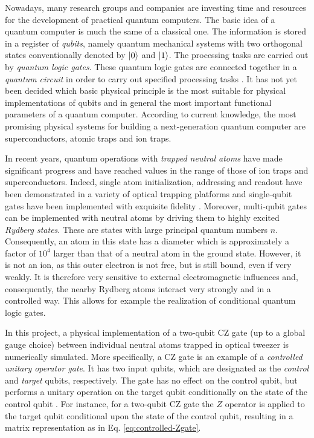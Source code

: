\documentclass[rmp,10pt,onecolumn,fleqn,notitlepage]{revtex4-1}
\begin{document}
Nowadays, many research groups and companies are investing time and resources for the development of practical quantum computers.
The basic idea of a quantum computer is much the same of a classical one. The information is stored in a register of \textit{qubits}, namely quantum mechanical systems with two orthogonal states conventionally denoted by $\left\vert{0}\right\rangle$ and $\left\vert{1}\right\rangle$.
The processing tasks are carried out by \textit{quantum logic gates}. These quantum logic gates are connected together in a \textit{quantum circuit} in order to carry out specified processing tasks \cite{10.5555/1200964}.
It has not yet been decided which basic physical principle is the most suitable for physical implementations of qubits and in general the most important functional parameters of a quantum computer. According to current knowledge, the most promising physical systems for building a next-generation quantum computer are superconductors, atomic traps and ion traps.

In recent years, quantum operations with \textit{trapped neutral atoms} have made significant progress and have reached values in the range of those of ion traps and superconductors.
Indeed, single atom initialization, addressing and readout have been demonstrated in a variety of optical trapping platforms and single-qubit gates have been implemented with exquisite fidelity \cite{PhysRevLett.123.170503}.
Moreover, multi-qubit gates can be implemented with neutral atoms by driving them to highly excited \textit{Rydberg states}.
These are states with large principal quantum numbers $n$.
Consequently, an atom in this state has a diameter which is approximately a factor of $10^4$ larger than that of a neutral atom in the ground state. However, it is not an ion, as this outer electron is not free, but is still bound, even if very weakly.
It is therefore very sensitive to external electromagnetic influences and, consequently, the nearby Rydberg atoms interact very strongly and in a controlled way. This allows for example the realization of conditional quantum logic gates.

In this project, a physical implementation \cite{PhysRevLett.123.170503} of a two-qubit CZ gate (up to a global gauge choice) between individual neutral atoms trapped in optical tweezer is numerically simulated. More specifically, a CZ gate is an example of a \textit{controlled unitary operator gate}. It has two input qubits, which are designated as the \textit{control} and \textit{target} qubits, respectively. The gate has no effect on the control qubit, but performs a unitary operation on the target qubit conditionally on the state of the control qubit \cite{Fox:1001868}. For instance, for a two-qubit CZ gate the $Z$ operator is applied to the target qubit conditional upon the state of the control qubit, resulting in a matrix representation as in Eq. \eqref{eq:controlled-Zgate}.
\end{document}
